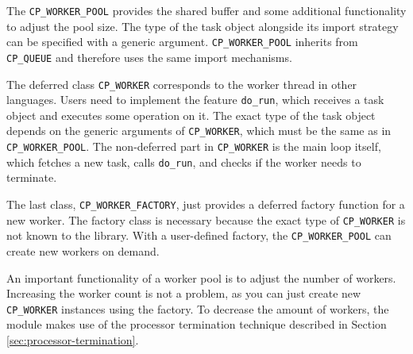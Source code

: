 The \lstinline!CP_WORKER_POOL! provides the shared buffer and some additional functionality to adjust the pool size.
The type of the task object alongside its import strategy can be specified with a generic argument.
\lstinline!CP_WORKER_POOL! inherits from \lstinline!CP_QUEUE! and therefore uses the same import mechanisms.

The deferred class \lstinline!CP_WORKER! corresponds to the worker thread in other languages.
Users need to implement the feature \lstinline!do_run!, which receives a task object and executes some operation on it.
The exact type of the task object depends on the generic arguments of \lstinline!CP_WORKER!, which must be the same as in \lstinline!CP_WORKER_POOL!.
The non-deferred part in \lstinline!CP_WORKER! is the main loop itself, which fetches a new task, calls \lstinline!do_run!, and checks if the worker needs to terminate.

The last class, \lstinline!CP_WORKER_FACTORY!, just provides a deferred factory function for a new worker.
The factory class is necessary because the exact type of \lstinline!CP_WORKER! is not known to the library.
With a user-defined factory, the \lstinline!CP_WORKER_POOL! can create new workers on demand.


An important functionality of a worker pool is to adjust the number of workers.
Increasing the worker count is not a problem, as you can just create new \lstinline!CP_WORKER! instances using the factory.
To decrease the amount of workers, the module makes use of the processor termination technique described in Section \ref{sec:processor-termination}.


